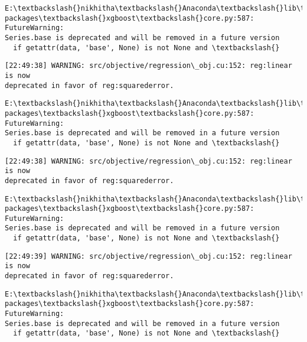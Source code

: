 \documentclass[11pt]{article}
\begin{document}
    \begin{Verbatim}[commandchars=\\\{\}]
E:\textbackslash{}nikhitha\textbackslash{}Anaconda\textbackslash{}lib\textbackslash{}site-packages\textbackslash{}xgboost\textbackslash{}core.py:587: FutureWarning:
Series.base is deprecated and will be removed in a future version
  if getattr(data, 'base', None) is not None and \textbackslash{}
    \end{Verbatim}

    \begin{Verbatim}[commandchars=\\\{\}]
[22:49:38] WARNING: src/objective/regression\_obj.cu:152: reg:linear is now
deprecated in favor of reg:squarederror.
    \end{Verbatim}

    \begin{Verbatim}[commandchars=\\\{\}]
E:\textbackslash{}nikhitha\textbackslash{}Anaconda\textbackslash{}lib\textbackslash{}site-packages\textbackslash{}xgboost\textbackslash{}core.py:587: FutureWarning:
Series.base is deprecated and will be removed in a future version
  if getattr(data, 'base', None) is not None and \textbackslash{}
    \end{Verbatim}

    \begin{Verbatim}[commandchars=\\\{\}]
[22:49:38] WARNING: src/objective/regression\_obj.cu:152: reg:linear is now
deprecated in favor of reg:squarederror.
    \end{Verbatim}

    \begin{Verbatim}[commandchars=\\\{\}]
E:\textbackslash{}nikhitha\textbackslash{}Anaconda\textbackslash{}lib\textbackslash{}site-packages\textbackslash{}xgboost\textbackslash{}core.py:587: FutureWarning:
Series.base is deprecated and will be removed in a future version
  if getattr(data, 'base', None) is not None and \textbackslash{}
    \end{Verbatim}

    \begin{Verbatim}[commandchars=\\\{\}]
[22:49:39] WARNING: src/objective/regression\_obj.cu:152: reg:linear is now
deprecated in favor of reg:squarederror.
    \end{Verbatim}

    \begin{Verbatim}[commandchars=\\\{\}]
E:\textbackslash{}nikhitha\textbackslash{}Anaconda\textbackslash{}lib\textbackslash{}site-packages\textbackslash{}xgboost\textbackslash{}core.py:587: FutureWarning:
Series.base is deprecated and will be removed in a future version
  if getattr(data, 'base', None) is not None and \textbackslash{}
    \end{Verbatim}
\end{document}
